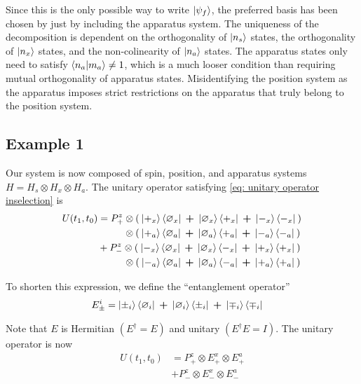Since this is the only possible way to write $\ket{\psi_f}$, the preferred basis has been chosen by just by including the apparatus system. The uniqueness of the decomposition is dependent on the orthogonality of $\ket{n_s}$ states, the orthogonality of $\ket{n_x}$ states, and the non-colinearity of $\ket{n_a}$ states. The apparatus states only need to satisfy $\braket{n_a | m_a} \neq 1$, which is a much looser condition than requiring mutual orthogonality of apparatus states. Misidentifying the position system as the apparatus imposes strict restrictions on the apparatus that truly belong to the position system.

\subsection{Example 1}
Our system is now composed of spin, position, and apparatus systems $H = H_s \otimes H_x \otimes H_a$. The unitary operator satisfying \autoref{eq: unitary operator inselection} is
\begin{align}
  U(t_1, t_0) &= P^z_+ \otimes \left(\: \ket{+_x}\bra{\varnothing_x} \: \bm{+} \: \ket{\varnothing_x}\bra{+_x} \: \bm{+} \: \ket{-_x}\bra{-_x} \: \right) \\ \nonumber
  &\phantom{{}=P^z_+} \otimes \left(\: \ket{+_a}\bra{\varnothing_a} \: \bm{+} \: \ket{\varnothing_a}\bra{+_a} \: \bm{+} \: \ket{-_a}\bra{-_a} \: \right)\\ \nonumber
  &+ P^z_- \otimes \left( \: \ket{-_x}\bra{\varnothing_x} \: \bm{+} \: \ket{\varnothing_x}\bra{-_x} \: \bm{+} \: \ket{+_x}\bra{+_x} \: \right) \\ \nonumber
 &\phantom{{}=P^z_-} \otimes \left(\: \ket{-_a}\bra{\varnothing_a} \: \bm{+} \: \ket{\varnothing_a}\bra{-_a} \: \bm{+} \: \ket{+_a}\bra{+_a} \: \right)
\end{align}

To shorten this expression, we define the ``entanglement operator''
\begin{align}
  E^i_\pm &= \ket{\pm_i}\bra{\varnothing_i} \: \bm{+} \: \ket{\varnothing_i}\bra{\pm_i} \: \bm{+} \: \ket{\mp_i}\bra{\mp_i}
\end{align}

Note that $E$ is Hermitian $\left(E^\dagger = E\right)$ and unitary $\left( E^\dagger E = I \right)$. The unitary operator is now
\begin{align}
  U(t_1, t_0) &= P^z_+ \otimes E^x_+ \otimes E^a_+ \\ \nonumber
  &+ P^z_- \otimes E^x_- \otimes E^a_-
\end{align}

